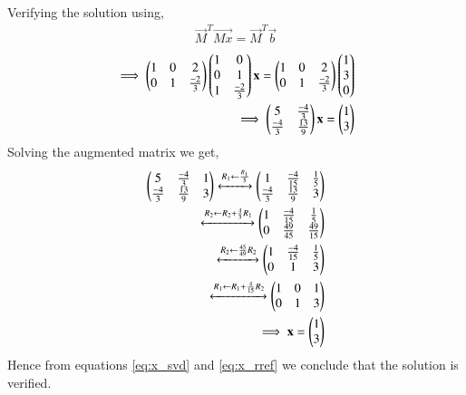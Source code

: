 \documentclass[journal,12pt,twocolumn]{IEEEtran}
\begin{document}
Verifying the solution using,
\begin{align}
\vec{M}^T\vec{Mx} = \vec{M}^T\vec{b}
\end{align}
\begin{align}
\implies \begin{pmatrix}1&0&2\\0&1&\frac{-2}{3}\end{pmatrix} \begin{pmatrix}1&0\\0&1\\1&\frac{-2}{3}\end{pmatrix} \mathbf{x} = \begin{pmatrix}1&0&2\\0&1&\frac{-2}{3}\end{pmatrix}\begin{pmatrix}1\\3\\0\end{pmatrix}\\
\implies \begin{pmatrix}5&\frac{-4}{3}\\\frac{-4}{3}&\frac{13}{9}\end{pmatrix}\mathbf{x} = \begin{pmatrix}1\\3\end{pmatrix}
\end{align}
Solving the augmented matrix we get,
\begin{align}
\begin{pmatrix}5&\frac{-4}{3}&1\\\frac{-4}{3}&\frac{13}{9}&3\end{pmatrix}\xleftrightarrow[]{R_1\leftarrow\frac{R_1}{5}}\begin{pmatrix}1 &\frac{-4}{15}&\frac{1}{5}\\\frac{-4}{3}&\frac{13}{9}&3\end{pmatrix}\\
\xleftrightarrow[]{R_2\leftarrow R_2+\frac{4}{3}R_1}\begin{pmatrix}1&\frac{-4}{15}&\frac{1}{5}\\0&\frac{49}{45}&\frac{49}{15}\end{pmatrix}\\
\xleftrightarrow[]{R_2\leftarrow \frac{45}{49}R_2}\begin{pmatrix}1&\frac{-4}{15}&\frac{1}{5}\\0&1&3\end{pmatrix}\\
\xleftrightarrow[]{R_1\leftarrow R_1+\frac{4}{15}R_2}\begin{pmatrix}1&0&1\\0&1&3\end{pmatrix}\\
\implies \mathbf{x} = \begin{pmatrix}1\\3 \end{pmatrix}\label{eq:x_rref}
\end{align}
Hence from equations \eqref{eq:x_svd} and \eqref{eq:x_rref} we conclude that the solution is verified.
\end{document}
